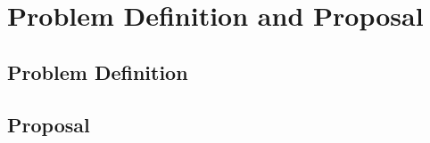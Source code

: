 \section{Problem Definition and Proposal}
\label{problem_definition_and_proposal}

\subsection{Problem Definition}

\subsection{Proposal}



